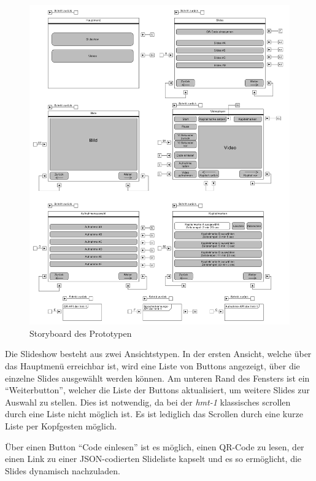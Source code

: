 \begin{figure}[htbp]
    \centering
    \includegraphics[width=1\textwidth]{data/bilder/UI-Storyboard.pdf}
    \caption{Storyboard des Prototypen}
    \label{fig:Storyboard_des_Prototypen}
\end{figure}

Die Slideshow besteht aus zwei Ansichtstypen. In der ersten Ansicht, welche über das Hauptmenü erreichbar ist, wird eine Liste von Buttons angezeigt, über die einzelne Slides ausgewählt werden können. Am unteren Rand des Fensters ist ein \enquote{Weiterbutton}, welcher die Liste der Buttons aktualisiert, um weitere Slides zur Auswahl zu stellen. Dies ist notwendig, da bei der \emph{hmt-1} klassisches scrollen durch eine Liste nicht möglich ist. Es ist lediglich das Scrollen durch eine kurze Liste per Kopfgesten möglich.

Über einen Button \enquote{Code einlesen} ist es möglich, einen QR-Code zu lesen, der einen Link zu einer JSON-codierten Slideliste kapselt und es so ermöglicht, die Slides dynamisch nachzuladen.

